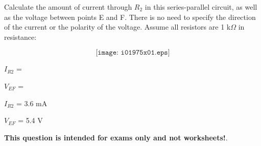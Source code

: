 

Calculate the amount of current through $R_2$ in this series-parallel circuit, as well as the voltage between points E and F.  There is no need to specify the direction of the current or the polarity of the voltage.  Assume all resistors are 1 k$\Omega$ in resistance:

$$\texttt{[image: i01975x01.eps]}$$

$I_{R2}$ = 

\vskip 10pt

$V_{EF}$ = 

\vskip 10pt







$I_{R2}$ = 3.6 mA

\vskip 10pt

$V_{EF}$ = 5.4 V







{\bf This question is intended for exams only and not worksheets!}.


